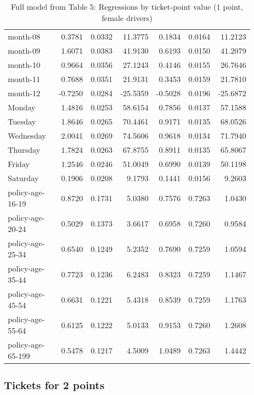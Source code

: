 \documentclass[10pt]{article}
\begin{document}
\begin{table}[ht]
\begin{tabular}{lrrrrrr}
  month-08 & 0.3781 & 0.0332 & 11.3775 & 0.1834 & 0.0164 & 11.2123 \\ 
  month-09 & 1.6071 & 0.0383 & 41.9130 & 0.6193 & 0.0150 & 41.2079 \\ 
  month-10 & 0.9664 & 0.0356 & 27.1243 & 0.4146 & 0.0155 & 26.7646 \\ 
  month-11 & 0.7688 & 0.0351 & 21.9131 & 0.3453 & 0.0159 & 21.7810 \\ 
  month-12 & -0.7250 & 0.0284 & -25.5359 & -0.5028 & 0.0196 & -25.6872 \\ 
  Monday & 1.4816 & 0.0253 & 58.6154 & 0.7856 & 0.0137 & 57.1588 \\ 
  Tuesday & 1.8646 & 0.0265 & 70.4461 & 0.9171 & 0.0135 & 68.0526 \\ 
  Wednesday & 2.0041 & 0.0269 & 74.5606 & 0.9618 & 0.0134 & 71.7940 \\ 
  Thursday & 1.7824 & 0.0263 & 67.8755 & 0.8911 & 0.0135 & 65.8067 \\ 
  Friday & 1.2546 & 0.0246 & 51.0049 & 0.6990 & 0.0139 & 50.1198 \\ 
  Saturday & 0.1906 & 0.0208 & 9.1793 & 0.1441 & 0.0156 & 9.2603 \\ 
  policy-age-16-19 & 0.8720 & 0.1731 & 5.0380 & 0.7576 & 0.7263 & 1.0430 \\ 
  policy-age-20-24 & 0.5029 & 0.1373 & 3.6617 & 0.6958 & 0.7260 & 0.9584 \\ 
  policy-age-25-34 & 0.6540 & 0.1249 & 5.2352 & 0.7690 & 0.7259 & 1.0594 \\ 
  policy-age-35-44 & 0.7723 & 0.1236 & 6.2483 & 0.8323 & 0.7259 & 1.1467 \\ 
  policy-age-45-54 & 0.6631 & 0.1221 & 5.4318 & 0.8539 & 0.7259 & 1.1763 \\ 
  policy-age-55-64 & 0.6125 & 0.1222 & 5.0133 & 0.9153 & 0.7260 & 1.2608 \\ 
  policy-age-65-199 & 0.5478 & 0.1217 & 4.5009 & 1.0489 & 0.7263 & 1.4442 \\ 
   \hline
\end{tabular}
\caption{Full model from Table 5: Regressions by ticket-point value (1 point, female drivers)} 
\label{tab_5_1_pts_F}
\end{table}


\clearpage
\pagebreak




\subsection{Tickets for 2 points}
\end{document}

